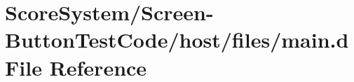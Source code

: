 \hypertarget{_screen-_button_test_code_2host_2files_2main_8d}{}\section{Score\+System/\+Screen-\/\+Button\+Test\+Code/host/files/main.d File Reference}
\label{_screen-_button_test_code_2host_2files_2main_8d}
